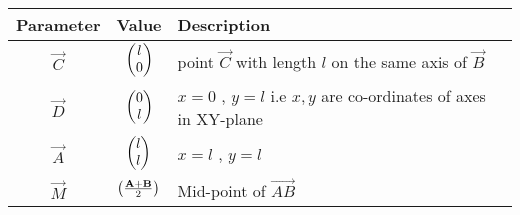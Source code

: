 \begin{tabular}{|c|c|p{5cm}|}
\hline
\textbf{Parameter} & \textbf{Value} & \textbf{Description} \\
\hline
	$\vec{C}$ & $\begin{pmatrix}l\\0\end{pmatrix}$ & point $\vec{C}$ with length $l$ on the same axis of $\vec{B}$ \\
\hline
	$\vec{D}$ & $\begin{pmatrix}0  \\ l \end{pmatrix}$ & $x = 0$ , $y = l$ i.e $x,y$ are co-ordinates of axes in XY-plane \\
\hline
	$\vec{A}$ & $\begin{pmatrix}l \\ l \end{pmatrix}$ & $x = l$ , $y = l$ \\
 \hline
    $\vec{M}$ & $\left(\frac{\mathbf{A+B}}{2}\right)$ & Mid-point of $\vec{AB}$ \\
\hline
\end{tabular}

